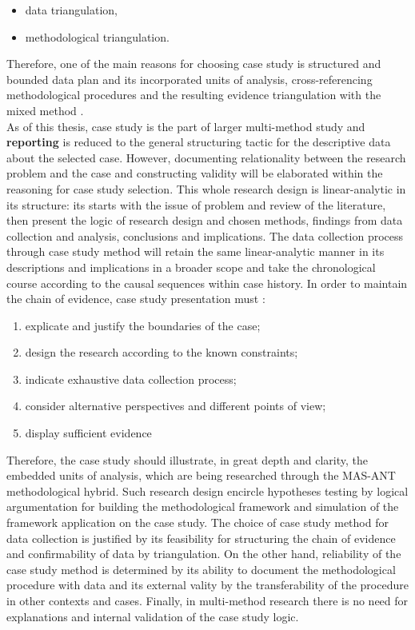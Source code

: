 \documentclass[11pt]{report}
\begin{document}
\begin{itemize}
\item data triangulation,
\item methodological triangulation. 
\end{itemize}
Therefore, one of the main reasons for choosing case study is structured and bounded data plan and its incorporated units of analysis, cross-referencing methodological procedures and the resulting evidence triangulation with the mixed method .
\\
As of this thesis, case study is the part of larger multi-method study and \textbf{reporting} is reduced to the general structuring tactic for 
the descriptive data about the selected case. However, documenting relationality between the research problem and the case and constructing validity will be elaborated within the reasoning for case study selection. This whole research design is linear-analytic in its structure: its starts with the issue of problem and review of the literature, then present the logic of research design and  chosen methods, findings from data collection and analysis, conclusions and implications. The data collection process through case study method will retain the same linear-analytic manner in its descriptions and implications in a broader scope and take the chronological course according to the causal sequences within case history. In order to maintain the chain of evidence, case study presentation must :
\begin{enumerate}
\item explicate and justify the boundaries of the case;
\item design the research according to the known constraints;
\item indicate exhaustive data collection process;
\item consider alternative perspectives and different points of view;
\item display sufficient evidence
\end{enumerate}
Therefore, the case study should illustrate, in great depth and clarity, the embedded units of analysis, which are being researched through the MAS-ANT methodological hybrid. Such research design encircle hypotheses testing by logical argumentation for building the methodological framework and simulation of the framework application on the case study. The choice of case study method for data collection is justified by its feasibility for structuring the chain of evidence and confirmability of data by triangulation. On the other hand, reliability of the case study method is determined by its ability to document the methodological procedure with data and its external vality by the transferability of the procedure in other contexts and cases. Finally, in multi-method research there is no need for explanations and internal validation of the case study logic.
\end{document}
